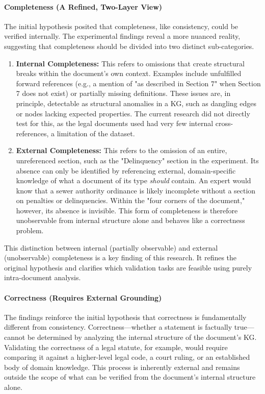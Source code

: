 \paragraph{Completeness (A Refined, Two-Layer View)}
The initial hypothesis posited that completeness, like consistency, could be verified internally. The experimental findings reveal a more nuanced reality, suggesting that completeness should be divided into two distinct sub-categories.

\begin{enumerate}
    \item \textbf{Internal Completeness:} This refers to omissions that create structural breaks within the document's own context. Examples include unfulfilled forward references (e.g., a mention of "as described in Section 7" when Section 7 does not exist) or partially missing definitions. These issues are, in principle, detectable as structural anomalies in a KG, such as dangling edges or nodes lacking expected properties. The current research did not directly test for this, as the legal documents used had very few internal cross-references, a limitation of the dataset.

    \item \textbf{External Completeness:} This refers to the omission of an entire, unreferenced section, such as the "Delinquency" section in the experiment. Its absence can only be identified by referencing external, domain-specific knowledge of what a document of its type \textit{should} contain. An expert would know that a sewer authority ordinance is likely incomplete without a section on penalties or delinquencies. Within the "four corners of the document," however, its absence is invisible. This form of completeness is therefore unobservable from internal structure alone and behaves like a correctness problem.
\end{enumerate}

This distinction between internal (partially observable) and external (unobservable) completeness is a key finding of this research. It refines the original hypothesis and clarifies which validation tasks are feasible using purely intra-document analysis.

\paragraph{Correctness (Requires External Grounding)}
The findings reinforce the initial hypothesis that correctness is fundamentally different from consistency. Correctness—whether a statement is factually true—cannot be determined by analyzing the internal structure of the document's KG. Validating the correctness of a legal statute, for example, would require comparing it against a higher-level legal code, a court ruling, or an established body of domain knowledge. This process is inherently external and remains outside the scope of what can be verified from the document's internal structure alone.


